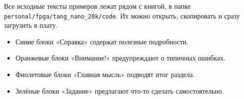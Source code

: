 Все исходные тексты примеров лежат рядом с книгой, в папке
\nolinkurl{personal/fpga/tang_nano_20k/code}. Их можно открыть, скопировать и
сразу загрузить в плату.

\begin{infobox}[Обозначения]
\begin{itemize}
  \item Синие блоки «Справка» содержат полезные подробности.
  \item Оранжевые блоки «Внимание!» предупреждают о типичных ошибках.
  \item Фиолетовые блоки «Главная мысль» подводят итог раздела.
  \item Зелёные блоки «Задание» предлагают что-то сделать самостоятельно.
\end{itemize}
\end{infobox}
